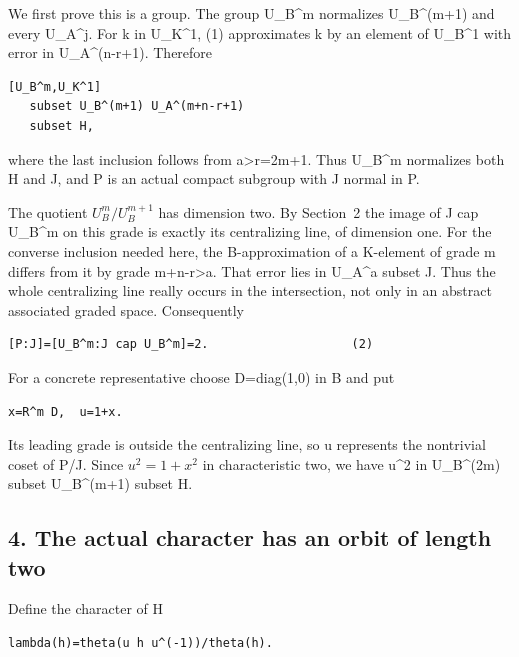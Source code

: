 We first prove this is a group. The group U\_B\^{}m normalizes
U\_B\^{}(m+1) and every U\_A\^{}j. For k in U\_K\^{}1, (1) approximates
k by an element of U\_B\^{}1 with error in U\_A\^{}(n-r+1). Therefore

\begin{Verbatim}[fontsize=\small,breaklines=true,breakanywhere=true]
[U_B^m,U_K^1]
   subset U_B^(m+1) U_A^(m+n-r+1)
   subset H,
\end{Verbatim}

where the last inclusion follows from a\textgreater r=2m+1. Thus
U\_B\^{}m normalizes both H and J, and P is an actual compact subgroup
with J normal in P.

The quotient \(U_B^m/U_B^{m+1}\) has dimension two. By
Section~2 the image of J cap U\_B\^{}m on this grade is exactly its
centralizing line, of dimension one. For the converse inclusion needed
here, the B-approximation of a K-element of grade m differs from it by
grade m+n-r\textgreater a. That error lies in U\_A\^{}a subset J. Thus
the whole centralizing line really occurs in the intersection, not only
in an abstract associated graded space. Consequently

\begin{Verbatim}[fontsize=\small,breaklines=true,breakanywhere=true]
[P:J]=[U_B^m:J cap U_B^m]=2.                    (2)
\end{Verbatim}

For a concrete representative choose D=diag(1,0) in B and put

\begin{Verbatim}[fontsize=\small,breaklines=true,breakanywhere=true]
x=R^m D,  u=1+x.
\end{Verbatim}

Its leading grade is outside the centralizing line, so u represents the
nontrivial coset of P/J. Since \(u^2=1+x^2\) in
characteristic two, we have u\^{}2 in U\_B\^{}(2m) subset U\_B\^{}(m+1)
subset H.

\hypertarget{rank4-the-actual-character-has-an-orbit-of-length-two}{%
\subsection{4. The actual character has an orbit of length
two}\label{rank4-the-actual-character-has-an-orbit-of-length-two}}

Define the character of H

\begin{Verbatim}[fontsize=\small,breaklines=true,breakanywhere=true]
lambda(h)=theta(u h u^(-1))/theta(h).
\end{Verbatim}

